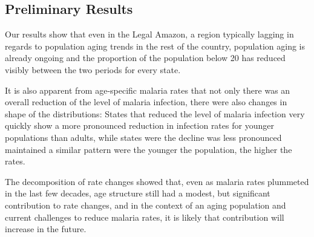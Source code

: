 \documentclass[
  12pt,
]{article}
\begin{document}
\hypertarget{preliminary-results}{%
\subsection{Preliminary Results}\label{preliminary-results}}

Our results show that even in the Legal Amazon, a region typically lagging in regards to population aging trends in the rest of the country, population aging is already ongoing and the proportion of the population below 20 has reduced visibly between the two periods for every state.

It is also apparent from age-specific malaria rates that not only there was an overall reduction of the level of malaria infection, there were also changes in shape of the distributions: States that reduced the level of malaria infection very quickly show a more pronounced reduction in infection rates for younger populations than adults, while states were the decline was less pronounced maintained a similar pattern were the younger the population, the higher the rates.

The decomposition of rate changes showed that, even as malaria rates plummeted in the last few decades, age structure still had a modest, but significant contribution to rate changes, and in the context of an aging population and current challenges to reduce malaria rates, it is likely that contribution will increase in the future.

  
\end{document}
